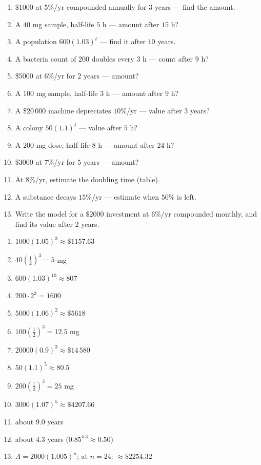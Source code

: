\documentclass[11pt]{article}
\begin{document}
\begin{recapbox}
\begin{multicols}{2}
\small
\begin{enumerate}[leftmargin=*,itemsep=3pt]
  \item $\$1000$ at $5\%$/yr compounded annually for $3$ years — find the amount.
  \item A $40$ mg sample, half-life $5$ h — amount after $15$ h?
  \item A population $600(1.03)^{t}$ — find it after $10$ years.
  \item A bacteria count of $200$ doubles every $3$ h — count after $9$ h?
  \item \$5000 at $6\%$/yr for $2$ years — amount?
  \item A $100$ mg sample, half-life $3$ h — amount after $9$ h?
  \item A \$20\,000 machine depreciates $10\%$/yr — value after $3$ years?
  \item A colony $50(1.1)^{t}$ — value after $5$ h?
  \item A $200$ mg dose, half-life $8$ h — amount after $24$ h?
  \item \$3000 at $7\%$/yr for $5$ years — amount?
  \item At $8\%$/yr, estimate the doubling time (table).
  \item A substance decays $15\%$/yr — estimate when $50\%$ is left.
  \item Write the model for a $\$2000$ investment at $6\%$/yr compounded monthly, and find its value after $2$ years.
\end{enumerate}
\end{multicols}
\end{recapbox}

\begin{keybox}
\begin{multicols}{2}
\small
\begin{enumerate}[leftmargin=*,itemsep=3pt]
  \item $1000(1.05)^3\approx\$1157.63$
  \item $40\left(\tfrac12\right)^3=5$ mg
  \item $600(1.03)^{10}\approx807$
  \item $200\cdot2^{3}=1600$
  \item $5000(1.06)^2\approx\$5618$
  \item $100\left(\tfrac12\right)^3=12.5$ mg
  \item $20000(0.9)^3\approx\$14\,580$
  \item $50(1.1)^5\approx80.5$
  \item $200\left(\tfrac12\right)^3=25$ mg
  \item $3000(1.07)^5\approx\$4207.66$
  \item about $9.0$ years
  \item about $4.3$ years ($0.85^{4.3}\approx0.50$)
  \item $A=2000(1.005)^{n}$; at $n=24$: $\approx\$2254.32$
\end{enumerate}
\end{multicols}
\end{keybox}
\end{document}
